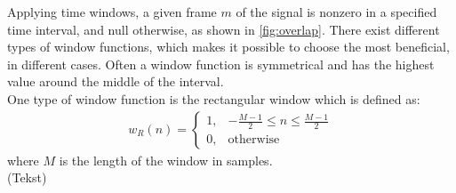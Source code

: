 Applying time windows, a given frame $m$ of the signal is nonzero in a specified time interval, and null otherwise, as shown in \autoref{fig:overlap}. There exist different types of window functions, which makes it possible to choose the most beneficial, in different cases. Often a window function is symmetrical and has the highest value around the middle of the interval. \\
One type of window function is the rectangular window which is defined as:
\begin{align*}
    w_R(n)=
    \begin{cases}
    1, & -\frac{M-1}{2}\leq n \leq \frac{M-1}{2} \\
    0, & \text{otherwise}
    \end{cases}
\end{align*}
where $M$ is the length of the window in samples.\\
(Tekst)
